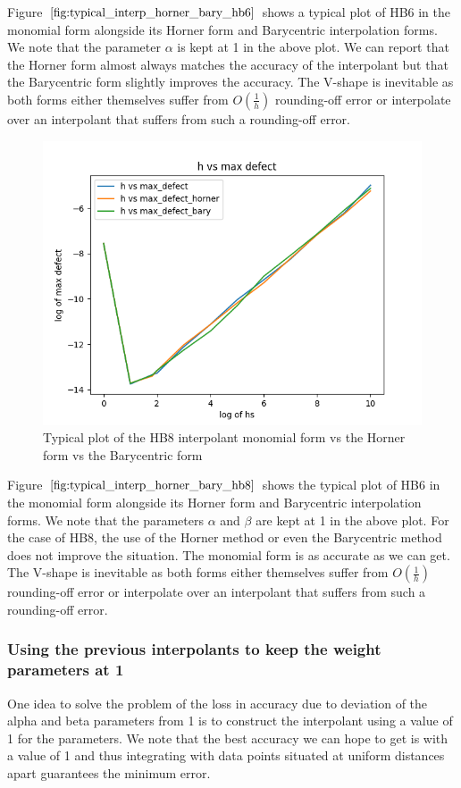 \documentclass{article}
\begin{document}
Figure $\ref{fig:typical_interp_horner_bary_hb6}$ shows a typical plot of HB6 in the monomial form alongside its Horner form and Barycentric interpolation forms. We note that the parameter $\alpha$ is kept at 1 in the above plot. We can report that the Horner form almost always matches the accuracy of the interpolant but that the Barycentric form slightly improves the accuracy. The V-shape is inevitable as both forms either themselves suffer from $O(\frac{1}{h})$ rounding-off error or interpolate over an interpolant that suffers from such a rounding-off error.

\begin{figure}[H]
\centering
\includegraphics[width=0.7\linewidth]{./figures/typical_interp_horner_bary_hb8}
\caption{Typical plot of the HB8 interpolant monomial form vs the Horner form vs the Barycentric form}
\label{fig:typical_interp_horner_bary_hb8}
\end{figure}

Figure $\ref{fig:typical_interp_horner_bary_hb8}$ shows the typical plot of HB6 in the monomial form alongside its Horner form and Barycentric interpolation forms. We note that the parameters $\alpha$ and $\beta$ are kept at 1 in the above plot. For the case of HB8, the use of the Horner method or even the Barycentric method does not improve the situation. The monomial form is as accurate as we can get. The V-shape is inevitable as both forms either themselves suffer from $O(\frac{1}{h})$ rounding-off error or interpolate over an interpolant that suffers from such a rounding-off error.

\subsubsection{Using the previous interpolants to keep the weight parameters at 1}
\label{section:keeping_alpha_at_1}
One idea to solve the problem of the loss in accuracy due to deviation of the alpha and beta parameters from 1 is to construct the interpolant using a value of 1 for the parameters. We note that the best accuracy we can hope to get is with a value of 1 and thus integrating with data points situated at uniform distances apart guarantees the minimum error.
\end{document}
